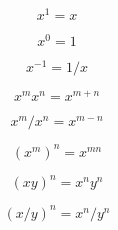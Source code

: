 






\[x^{1} = x\]

\[x^{0} = 1\]

\[x^{-1} = 1/x\]

\[x^{m}x^{n} = x^{m+n}\]

\[x^{m}/x^{n} = x^{m-n}\]

\[(x^{m})^{n} = x^{mn}\]

\[(xy)^{n} = x^{n}y^{n}\]

\[(x/y)^{n} = x^{n}/y^{n}\]

